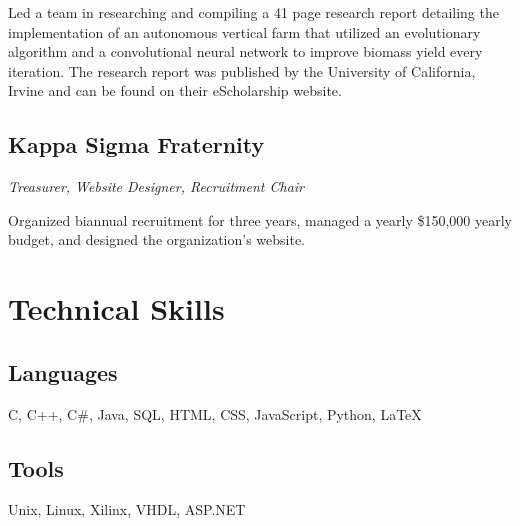 \documentclass{article}
\begin{document}
Led a team in researching and compiling a 41 page research report detailing the implementation of an 
autonomous vertical farm that utilized an evolutionary algorithm and a convolutional neural network 
to improve biomass yield every iteration. The research report was published by the University of 
California, Irvine and can be found on their eScholarship website.

\subsection{Kappa Sigma Fraternity}

\noindent\textit{Treasurer, Website Designer, Recruitment Chair}

Organized biannual recruitment for three years, managed a yearly \$150,000 yearly budget, and designed 
the organization's website.

\section{Technical Skills}

\subsection{Languages}

C, C++, C\#, Java, SQL, HTML, CSS, JavaScript, Python, \LaTeX

\subsection{Tools}

Unix, Linux, Xilinx, VHDL, ASP.NET 
\end{document}
